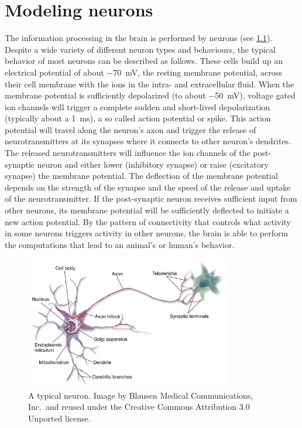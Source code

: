 \chapter{Modeling neurons}
The information processing in the brain is performed by neurons (see \cref{fig:neuron}).
Despite a wide variety of different neuron types and behaviours, the typical behavior of most neurons can be described as follows.
These cells build up an electrical potential of about \SI{-70}{\milli\volt}, the resting membrane potential, across their cell membrane with the ions in the intra- and extracellular fluid.
When the membrane potential is sufficiently depolarized (to about \SI{-50}{\milli\volt}), voltage gated ion channels will trigger a complete sudden and short-lived depolarization (typically about a \SI{1}{\milli\second}), a so called action potential or spike.
This action potential will travel along the neuron's axon and trigger the release of neurotransmitters at its synapses where it connects to other neuron's dendrites.
The released neurotransmitters will influence the ion channels of the post-synaptic neuron and either lower (inhibitory synapse) or raise (excitatory synapse) the membrane potential.
The deflection of the membrane potential depends on the strength of the synapse and the speed of the release and uptake of the neurotransmitter.
If the post-synaptic neuron receives sufficient input from other neurons, its membrane potential will be sufficiently deflected to initiate a new action potential.
By the pattern of connectivity that controls what activity in some neurons triggers activity in other neurons, the brain is able to perform the computations that lead to an animal's or human's behavior.

\begin{figure}
    \centering
    \includegraphics[width=0.8\textwidth]{figures/Blausen_0657_MultipolarNeuron}
    \caption{A typical neuron. Image by Blausen Medical Communications, Inc.\ and reused under the Creative Commons Attribution 3.0 Unported license.}\label{fig:neuron}
\end{figure}

